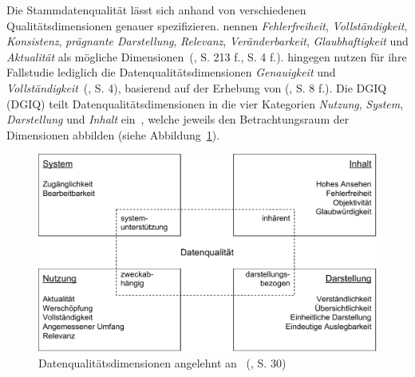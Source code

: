 \documentclass[
  language=german, %
  type=bachelor,%
  ngerman
]{isthesis}
\begin{document}
\begin{content}
	Die Stammdatenqualität lässt sich anhand von verschiedenen
	Qualitätsdimensionen genauer spezifizieren.
	\textsc{\citeauthor{pipino2002data}} nennen \zB{} \textit{Fehlerfreiheit},
	\textit{Vollständigkeit}, \textit{Konsistenz}, \textit{prägnante
	Darstellung}, \textit{Relevanz}, \textit{Veränderbarkeit},
	\textit{Glaubhaftigkeit} und \textit{Aktualität} als mögliche
	Dimensionen~(\citeyear{pipino2002data, legner2007stammdaten}, S. 213 f., S. 4
	f.). \textsc{\citeauthor{baghi2013controlling}} hingegen nutzen für ihre
	Fallstudie lediglich die Datenqualitätsdimensionen \textit{Genauigkeit} und
	\textit{Vollständigkeit}~(\citeyear{baghi2013controlling}, S. 4), basierend
	auf der Erhebung von
	\textsc{\citeauthor{wand1996anchoring}} (\citeyear{wand1996anchoring}, S. 8
	f.). Die \acrlong{DGIQ} (\acrshort{DGIQ}) teilt Datenqualitätsdimensionen in
	die vier Kategorien \textit{Nutzung}, \textit{System}, \textit{Darstellung}
	und \textit{Inhalt} ein~\cite[][S. 29 - 31]{rohweder2015informationsqualitat},
	welche jeweils den Betrachtungsraum der Dimensionen abbilden (siehe
	Abbildung~\ref{15-dimensions}).

  \begin{figure}
    \includegraphics[scale=0.60]{content/figures/15-dimensions}
    \caption[Datenqualitätsdimensionen]{Datenqualitätsdimensionen angelehnt an~\textsc{\citeauthor{rohweder2015informationsqualitat}} (\citeyear{rohweder2015informationsqualitat}, S. 30)}\label{15-dimensions}
  \end{figure}


\end{content}
\end{document}
